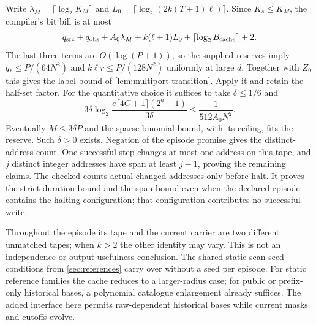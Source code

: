 \begin{informalproof}
Write $\lambda_M=\lceil\log_2K_M\rceil$ and
$L_0=\lceil\log_2(2k(T+1)\ell)\rceil$. Since $K_s\le K_M$,
the compiler's bit bill is at most
\[
 q_{\rm src}+q_{\rm obs}+A_0\lambda_M+
       k(\ell+1)L_0+\lceil\log_2B_{\rm cache}\rceil+2.
\]
The last three terms are $O(\log(P+1))$, so the supplied reserves imply
$q_*\le P/(64N^2)$ and $k\ell r\le P/(128N^2)$ uniformly at large $d$.
Together with $Z_0$ this gives the label bound of
\cref{lem:multiport-transition}. Apply it and retain the half-set factor.
For the quantitative choice it suffices to take $\delta\le1/6$ and
\[
 3\delta\log_2\frac{e\lceil4C+1\rceil(2^a-1)}{3\delta}
       \le\frac1{512A_0N^2}.
\]
Eventually $M\le3\delta P$ and the sparse binomial bound, with its ceiling,
fits the reserve. Such $\delta>0$ exists. Negation of the episode promise
gives the distinct-address count. One successful step changes at most one
address on this tape, and $j$ distinct integer addresses have span at least
$j-1$, proving the remaining claims.
The checked  counts
actual changed addresses only before halt. It proves the strict duration
bound and the span bound even when the declared episode contains the halting
configuration; that configuration contributes no successful write.
\end{informalproof}

Throughout the episode its tape and the current carrier are two different
unmatched tapes; when $k>2$ the other identity may vary. This is not an
independence or output-usefulness conclusion. The shared static scan seed
conditions from \cref{sec:references} carry over without a seed per episode.
For static reference families the cache reduces to a larger-radius case;
for public or prefix-only historical bases, a polynomial catalogue enlargement
already suffices. The added interface here permits raw-dependent historical
bases while current masks and cutoffs evolve.
